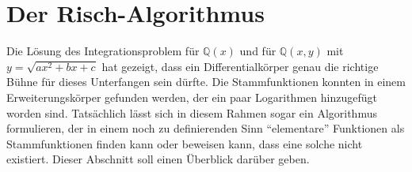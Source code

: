 %
%
%
\section{Der Risch-Algorithmus
\label{buch:integral:section:risch}}
Die Lösung des Integrationsproblem für $\mathbb{Q}(x)$ und für
$\mathbb{Q}(x,y)$ mit $y=\!\sqrt{ax^2+bx+c}$ hat gezeigt, dass
ein Differentialkörper genau die richtige Bühne für dieses Unterfangen
sein dürfte.
Die Stammfunktionen konnten in einem Erweiterungskörper gefunden
werden, der ein paar Logarithmen hinzugefügt worden sind.
Tatsächlich lässt sich in diesem Rahmen sogar ein Algorithmus
formulieren, der in einem noch zu definierenden Sinn ``elementare''
Funktionen als Stammfunktionen finden kann oder beweisen kann, dass
eine solche nicht existiert.
Dieser Abschnitt soll einen Überblick darüber geben.







